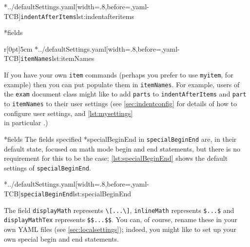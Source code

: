         \begin{cmhtcbraster}[raster columns=3,
            raster left skip=-3.5cm,
                             raster right skip=-2cm,
                             raster column skip=.03\linewidth]
		\cmhlistingsfromfile[style=indentAfterItems]*{../defaultSettings.yaml}[width=.8\linewidth,before=\centering,yaml-TCB]{\texttt{indentAfterItems}}{lst:indentafteritems}
        \end{cmhtcbraster}

*{fields}
	\begin{wrapfigure}[5]{r}[0pt]{5cm}
		\cmhlistingsfromfile[style=itemNames]*{../defaultSettings.yaml}[width=.8\linewidth,before=\centering,yaml-TCB]{\texttt{itemNames}}{lst:itemNames}
	\end{wrapfigure}
	If you have your own \texttt{item} commands (perhaps you prefer to use
	\texttt{myitem}, for example) then you can put populate them in
	\texttt{itemNames}. For example, users of the \texttt{exam} document class
	might like to add \texttt{parts} to \texttt{indentAfterItems} and
	\texttt{part} to \texttt{itemNames} to their user settings (see
	\vref{sec:indentconfig} for details of how to configure user settings, and
	\vref{lst:mysettings} \\ in particular \label{page:examsettings}.)

*{fields}\label{yaml:specialBeginEnd}
	The fields specified%
	*{specialBeginEnd} in
	\texttt{specialBeginEnd} are, in their default state, focused on math mode begin and end
	statements, but there is no requirement for this to be the case; \cref{lst:specialBeginEnd}
	shows the default settings of \texttt{specialBeginEnd}.

	\cmhlistingsfromfile[style=specialBeginEnd]*{../defaultSettings.yaml}[width=.8\linewidth,before=\centering,yaml-TCB]{\texttt{specialBeginEnd}}{lst:specialBeginEnd}

	The field \texttt{displayMath} represents \lstinline!\[...\]!,
	\texttt{inlineMath} represents
	\lstinline!$...$! and \texttt{displayMathTex} represents \lstinline!$$...$$!.
	You can, of course, rename these in your own YAML files (see \vref{sec:localsettings});
	indeed, you might like to set up your own special begin and end statements.

